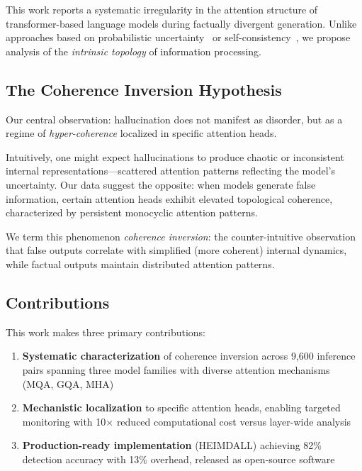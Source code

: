 \documentclass[11pt,twocolumn]{article}
\begin{document}
This work reports a systematic irregularity in the attention structure of transformer-based language models during factually divergent generation. Unlike approaches based on probabilistic uncertainty~\cite{kuhn2023semantic} or self-consistency~\cite{manakul2023selfcheckgpt}, we propose analysis of the \textit{intrinsic topology} of information processing.

\subsection{The Coherence Inversion Hypothesis}

Our central observation: hallucination does not manifest as disorder, but as a regime of \textit{hyper-coherence} localized in specific attention heads.

Intuitively, one might expect hallucinations to produce chaotic or inconsistent internal representations---scattered attention patterns reflecting the model's uncertainty. Our data suggest the opposite: when models generate false information, certain attention heads exhibit elevated topological coherence, characterized by persistent monocyclic attention patterns.

We term this phenomenon \textit{coherence inversion}: the counter-intuitive observation that false outputs correlate with simplified (more coherent) internal dynamics, while factual outputs maintain distributed attention patterns.

\subsection{Contributions}

This work makes three primary contributions:

\begin{enumerate}
    \item \textbf{Systematic characterization} of coherence inversion across 9,600 inference pairs spanning three model families with diverse attention mechanisms (MQA, GQA, MHA)

    \item \textbf{Mechanistic localization} to specific attention heads, enabling targeted monitoring with 10$\times$ reduced computational cost versus layer-wide analysis

    \item \textbf{Production-ready implementation} (HEIMDALL) achieving 82\% detection accuracy with 13\% overhead, released as open-source software
\end{enumerate}
\end{document}
